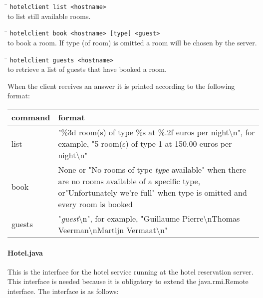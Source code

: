 \documentclass[a4paper,10pt]{article}
\begin{document}
\begin{tabbing}
\hspace{20pt}\=\kill
 \> \texttt{hotelclient list <hostname>} \\
 \> to list still available rooms.
\end{tabbing}

\begin{tabbing}
\hspace{20pt}\=\kill
 \> \texttt{hotelclient book <hostname> [type] <guest>} \\
 \> to book a room. If type (of room) is omitted a room will be chosen by the server.
\end{tabbing}

\begin{tabbing}
\hspace{20pt}\=\kill
 \> \texttt{hotelclient guests <hostname>} \\
 \> to retrieve a list of guests that have booked a room.
\end{tabbing}

When the client receives an answer it is printed according to the following format:

\begin{center}
\begin{tabular}{ l | p{9.3cm} }
\textbf{command} & \textbf{format}\\ \hline
list & "\%3d room(s) of type \%s at \%.2f euros per night\textbackslash n", for example, "5 room(s) of type 1 at 150.00 euros per night\textbackslash n"\\ \hline
book & None or "No rooms of type \emph{type} available" when there are no rooms available of a specific type, or"Unfortunately we're full" when type is omitted and every room is booked \\ \hline
guests & "\emph{guest}\textbackslash n", for example, "Guillaume Pierre\textbackslash nThomas Veerman\textbackslash nMartijn Vermaat\textbackslash n" \\
\end{tabular}
\end{center}

\paragraph{Hotel.java}
This is the interface for the hotel service running at the hotel reservation server. This interface is needed because it is obligatory to extend the java.rmi.Remote interface. The interface is as follows:
\end{document}
